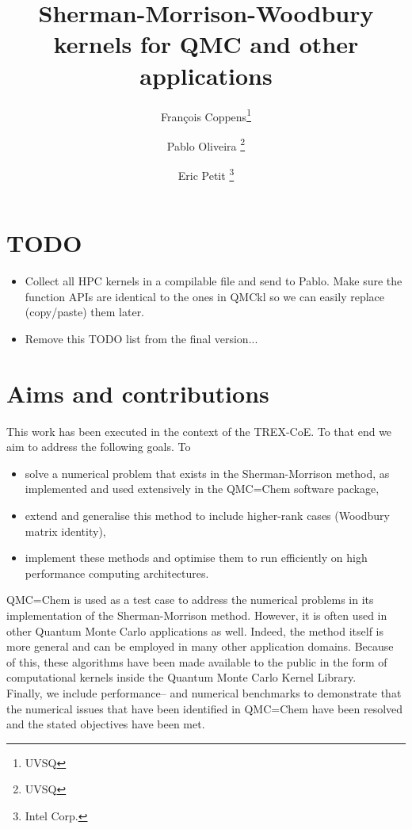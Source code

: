 \documentclass[11pt]{article}
\title{Sherman-Morrison-Woodbury kernels for QMC and other applications}
\author{Fran\c{c}ois Coppens\thanks{UVSQ} \and Pablo Oliveira \thanks{UVSQ} \and Eric Petit \thanks{Intel Corp.}}
\numberwithin{figure}{section}
\numberwithin{table}{section}
\begin{document}
	\maketitle
	\tableofcontents
	
  \section*{TODO}
    \begin{itemize}           
      \item Collect all HPC kernels in a compilable file and send to Pablo. Make sure the function APIs are identical to the ones in QMCkl so we can easily replace (copy/paste) them later.
      \item Remove this TODO list from the final version...
    \end{itemize}
    
  \newpage
  \section{Aims and contributions}      
    This work has been executed in the context of the TREX-CoE\cite{trex-coe}. To that end we aim to address the following goals. To
    \begin{itemize}
      \item solve a numerical problem that exists in the Sherman-Morrison method, as implemented and used extensively in the QMC=Chem\cite{qmc-chem} software package,
      \item extend and generalise this method to include higher-rank cases (Woodbury matrix identity),
      \item implement these methods and optimise them to run efficiently on high performance computing architectures.
    \end{itemize}
      
      QMC=Chem is used as a test case to address the numerical problems in its implementation of the Sherman-Morrison method. However, it is often used in other Quantum Monte Carlo applications as well. Indeed, the method itself is more general and can be employed in many other application domains. Because of this, these algorithms have been made available to the public in the form of computational kernels inside the Quantum Monte Carlo Kernel Library\cite{qmckl}.\\
      
      Finally, we include performance-- and numerical benchmarks to demonstrate that the numerical issues that have been identified in QMC=Chem have been resolved and the stated objectives have been met.
\end{document}

